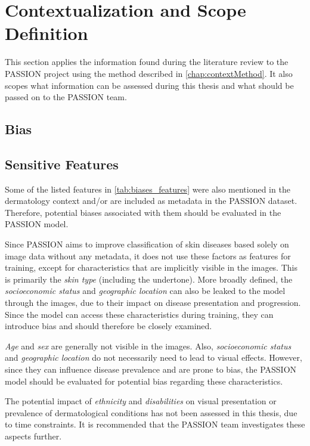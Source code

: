 \documentclass[12pt, a4paper, oneside]{book}   	%
\begin{document}
		\section{Contextualization and Scope Definition}
		This section applies the information found during the literature review to the PASSION project using the method described in \autoref{chap:contextMethod}. It also scopes what information can be assessed during this thesis and what should be passed on to the PASSION team.
		
		\subsection{Bias}
			
		\subsection{Sensitive Features}
			Some of the listed features in \autoref{tab:biases_features} were also mentioned in the dermatology context and/or are included as metadata in the PASSION dataset. Therefore, potential biases associated with them should be evaluated in the PASSION model.
			
			Since PASSION aims to improve classification of skin diseases based solely on image data without any metadata, it does not use these factors as features for training, except for characteristics that are implicitly visible in the images. This is primarily the \textit{skin type} (including the undertone). More broadly defined, the \textit{socioeconomic status} and \textit{geographic location} can also be leaked to the model through the images, due to their impact on disease presentation and progression. Since the model can access these characteristics during training, they can introduce bias and should therefore be closely examined.
			
			\textit{Age} and \textit{sex} are generally not visible in the images. Also, \textit{socioeconomic status} and \textit{geographic location} do not necessarily need to lead to visual effects. However, since they can influence disease prevalence and are prone to bias, the PASSION model should be evaluated for potential bias regarding these characteristics.
			
			The potential impact of \textit{ethnicity} and \textit{disabilities} on visual presentation or prevalence of dermatological conditions has not been assessed in this thesis, due to time constraints. It is recommended that the PASSION team investigates these aspects further.
			
\end{document}
